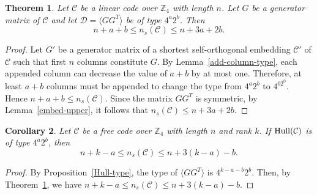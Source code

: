 \documentclass{article}
\newtheorem{theorem}{Theorem}[section]
\newtheorem{corollary}[theorem]{Corollary}
\theoremstyle{definition}
\theoremstyle{remark}
\begin{document}
\begin{theorem}\label{embedding-bound}
    Let $\mathcal{C}$ be a linear code over $\mathbb{Z}_4$ with length $n$. Let $G$ be a generator matrix of $\mathcal{C}$ and let $\mathcal{D}=\langle GG^T\rangle$ be of type $4^a2^b$. Then
    \[
    n+a+b\le n_s(\mathcal{C})\le n+3a+2b.
    \]
\end{theorem}
\begin{proof}
    Let $G'$ be a generator matrix of a shortest self-orthogonal embedding $\mathcal{C}'$ of $\mathcal{C}$ such that first $n$ columns constitute $G$. By Lemma~\ref{add-column-type}, each appended column can decrease the value of $a+b$ by at most one. Therefore, at least $a+b$ columns must be appended to change the type from $4^a2^b$ to $4^02^0$. Hence $n+a+b\le n_s(\mathcal{C})$. Since the matrix $GG^T$ is symmetric, by Lemma~\ref{embed-upper}, it follows that $n_s(\mathcal{C})\le n+3a+2b$.
\end{proof}

\begin{corollary}\label{free_emb_bound}
    Let $\mathcal{C}$ be a free code over $\mathbb{Z}_4$ with length $n$ and rank $k$. If ${\rm{Hull}}(\mathcal{C})$ is of type $4^a2^b$, then 
    \[
    n+k-a\le n_s(\mathcal{C})\le n+3(k-a)-b.
    \]
\end{corollary}
\begin{proof}
By Proposition~\ref{Hull-type}, the type of $\langle GG^T\rangle$ is $4^{k-a-b}2^b$. Then, by Theorem~\ref{embedding-bound}, we have $n+k-a\le n_s(\mathcal{C})\le n+3(k-a)-b$.
\end{proof}
\end{document}
